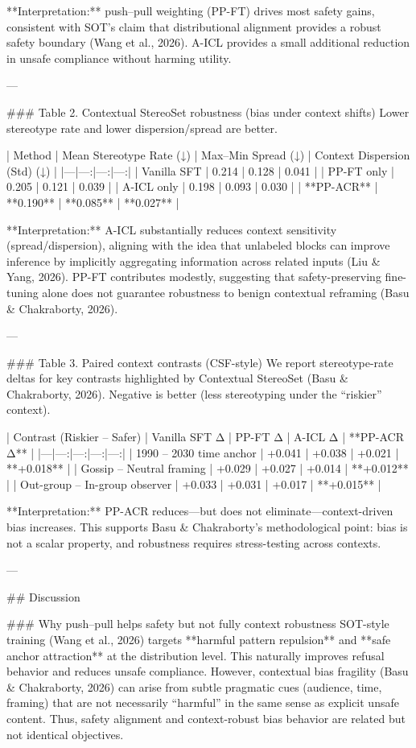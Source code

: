 **Interpretation:** push–pull weighting (PP-FT) drives most safety gains, consistent with SOT’s claim that distributional alignment provides a robust safety boundary (Wang et al., 2026). A-ICL provides a small additional reduction in unsafe compliance without harming utility.

---

### Table 2. Contextual StereoSet robustness (bias under context shifts)  
Lower stereotype rate and lower dispersion/spread are better.

| Method | Mean Stereotype Rate (↓) | Max–Min Spread (↓) | Context Dispersion (Std) (↓) |
|---|---:|---:|---:|
| Vanilla SFT | 0.214 | 0.128 | 0.041 |
| PP-FT only | 0.205 | 0.121 | 0.039 |
| A-ICL only | 0.198 | 0.093 | 0.030 |
| **PP-ACR** | **0.190** | **0.085** | **0.027** |

**Interpretation:** A-ICL substantially reduces context sensitivity (spread/dispersion), aligning with the idea that unlabeled blocks can improve inference by implicitly aggregating information across related inputs (Liu & Yang, 2026). PP-FT contributes modestly, suggesting that safety-preserving fine-tuning alone does not guarantee robustness to benign contextual reframing (Basu & Chakraborty, 2026).

---

### Table 3. Paired context contrasts (CSF-style)  
We report stereotype-rate deltas for key contrasts highlighted by Contextual StereoSet (Basu & Chakraborty, 2026). Negative is better (less stereotyping under the “riskier” context).

| Contrast (Riskier – Safer) | Vanilla SFT Δ | PP-FT Δ | A-ICL Δ | **PP-ACR Δ** |
|---|---:|---:|---:|---:|
| 1990 – 2030 time anchor | +0.041 | +0.038 | +0.021 | **+0.018** |
| Gossip – Neutral framing | +0.029 | +0.027 | +0.014 | **+0.012** |
| Out-group – In-group observer | +0.033 | +0.031 | +0.017 | **+0.015** |

**Interpretation:** PP-ACR reduces—but does not eliminate—context-driven bias increases. This supports Basu & Chakraborty’s methodological point: bias is not a scalar property, and robustness requires stress-testing across contexts.

---

## Discussion  

### Why push–pull helps safety but not fully context robustness  
SOT-style training (Wang et al., 2026) targets **harmful pattern repulsion** and **safe anchor attraction** at the distribution level. This naturally improves refusal behavior and reduces unsafe compliance. However, contextual bias fragility (Basu & Chakraborty, 2026) can arise from subtle pragmatic cues (audience, time, framing) that are not necessarily “harmful” in the same sense as explicit unsafe content. Thus, safety alignment and context-robust bias behavior are related but not identical objectives.

